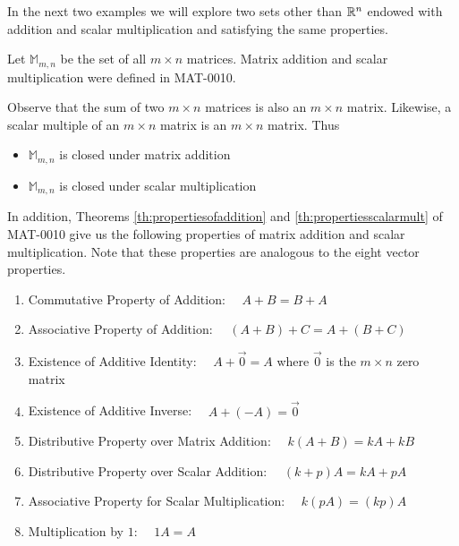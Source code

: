 \documentclass{ximera}
\begin{document}
In the next two examples we will explore two sets other than $\mathbb{R}^n$ endowed with addition and scalar multiplication and satisfying the same properties.

\begin{example}\label{ex:setofmatricesvectorspace}
Let $\mathbb{M}_{m,n}$ be the set of all $m\times n$ matrices.  Matrix addition and scalar multiplication were defined in MAT-0010.

Observe that the sum of two $m\times n$ matrices is also an $m\times n$ matrix. Likewise, a scalar multiple of an $m\times n$ matrix is an $m\times n$ matrix.  Thus 
\begin{itemize}
    \item[] $\mathbb{M}_{m,n}$ is closed under matrix addition
    \item[] $\mathbb{M}_{m,n}$ is closed under scalar multiplication
\end{itemize}

In addition, Theorems \ref{th:propertiesofaddition} and \ref{th:propertiesscalarmult} of MAT-0010 give us the following properties of matrix addition and scalar multiplication.  Note that these properties are analogous to the eight vector properties.
\begin{enumerate}
  \item 
  Commutative Property of Addition:  $\quad A+B=B+A$
  \item 
  Associative Property of Addition: $\quad (A+B)+C=A+(B+C)$
  \item 
  Existence of Additive Identity:  $\quad A+\vec{0}=A$ where $\vec{0}$ is the $m \times n$ zero matrix
  \item 
  Existence of Additive Inverse:  $\quad A+(-A)=\vec{0}$
  \item
  Distributive Property over Matrix Addition:  $\quad k(A+B)=kA+kB$
  \item
  Distributive Property over Scalar Addition:  $\quad (k+p)A=kA+pA$
  \item 
  Associative Property for Scalar Multiplication: $\quad k(pA)=(kp)A$
  \item 
  Multiplication by $1$: $\quad 1A=A$
  \end{enumerate}
\end{example}
\end{document}
